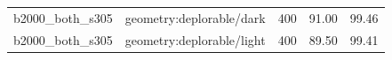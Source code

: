 \begin{longtable}{l>{\raggedright\arraybackslash}p{.42\linewidth}rrr}
b2000\_\allowbreak{}both\_\allowbreak{}s305 & %
geometry:deplorable/dark & %
400 & %
91.00 & %
99.46 \\ %

b2000\_\allowbreak{}both\_\allowbreak{}s305 & %
geometry:deplorable/light & %
400 & %
89.50 & %
99.41 \\ %


\end{longtable}
